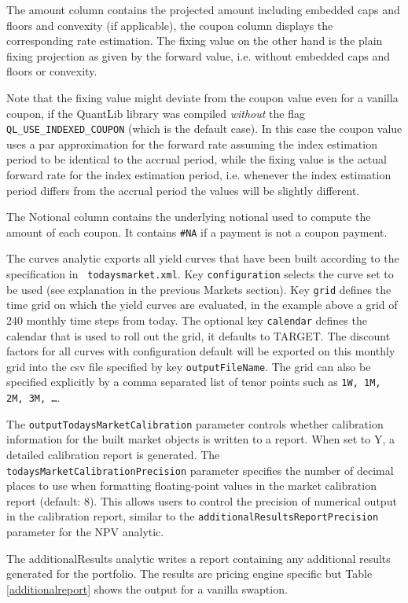 The amount column contains the projected amount including embedded caps and floors and convexity (if applicable), the
coupon column displays the corresponding rate estimation. The fixing value on the other hand is the plain fixing
projection as given by the forward value, i.e. without embedded caps and floors or convexity.

Note that the fixing value might deviate from the coupon value even for a vanilla coupon, if the QuantLib library was
compiled {\em without} the flag \verb+QL_USE_INDEXED_COUPON+ (which is the default case). In this case the coupon value
uses a par approximation for the forward rate assuming the index estimation period to be identical to the accrual
period, while the fixing value is the actual forward rate for the index estimation period, i.e. whenever the index estimation
period differs from the accrual period the values will be slightly different.

The Notional column contains the underlying notional used to compute the amount of each coupon. It contains \verb+#NA+
if a payment is not a coupon payment.

The curves analytic exports all yield curves that have been built according to the specification in {\tt
  todaysmarket.xml}. Key {\tt configuration} selects the curve set to be used (see explanation in the previous Markets
section).  Key {\tt grid} defines the time grid on which the yield curves are evaluated, in the example above a grid of
240 monthly time steps from today. The optional key {\tt calendar} defines the calendar that is used to roll out the
grid, it defaults to TARGET. The discount factors for all curves with configuration default will be exported on this
monthly grid into the csv file specified by key {\tt outputFileName}. The grid can also be specified explicitly by a
comma separated list of tenor points such as {\tt 1W, 1M, 2M, 3M, \dots}.

The {\tt outputTodaysMarketCalibration} parameter controls whether calibration information for the built market objects
is written to a report. When set to Y, a detailed calibration report is generated. The {\tt todaysMarketCalibrationPrecision}
parameter specifies the number of decimal places to use when formatting floating-point values in the market calibration
report (default: 8). This allows users to control the precision of numerical output in the calibration report, similar to
the {\tt additionalResultsReportPrecision} parameter for the NPV analytic.

The additionalResults analytic writes a report containing any additional results generated for the portfolio. The results are pricing engine specific but Table \ref{additionalreport} shows the output for a vanilla swaption.

